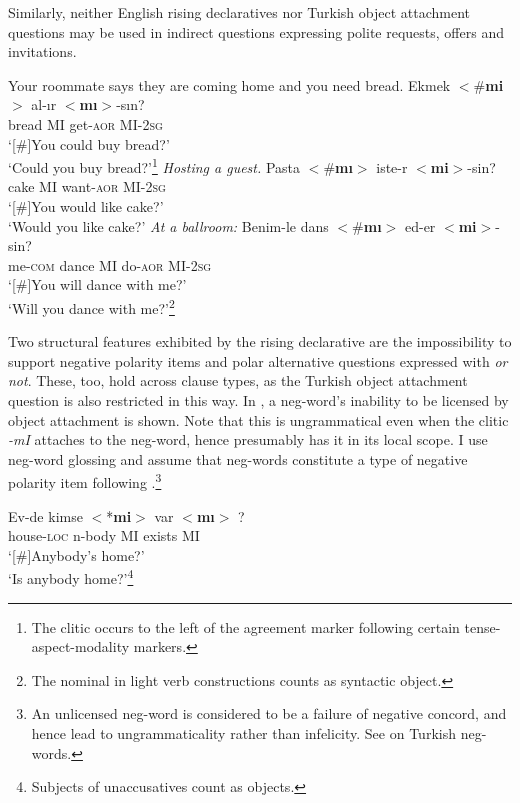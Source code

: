 \documentclass[output=paper,colorlinks,citecolor=brown]{langscibook}
\begin{document}
Similarly, neither English rising declaratives nor Turkish object attachment questions may be used in indirect questions expressing polite requests, offers and invitations.

\ea Your roommate says they are coming home and you need bread.
\sn 
\gll Ekmek $<$\#\textbf{mi}$>$ al-ır $<$\textbf{mı}$>$-sın?\\
bread \phantom{$<$}MI get-\textsc{aor} \phantom{$<$}MI-\textsc{2sg}\\
\glt `[\#]You could buy bread?'\\
`Could you buy bread?'\footnote{The clitic occurs to the left of the agreement marker following certain tense-aspect-modality markers.}  
\ex\textit{Hosting a guest.}
\sn
\gll Pasta $<$\#\textbf{mı}$>$ iste-r $<$\textbf{mi}$>$-sin?\\
cake  \phantom{$<$}MI want-\textsc{aor} \phantom{$<$}MI-\textsc{2sg}\\
\glt `[\#]You would like cake?'\\
`Would you like cake?'
\ex\textit{At a ballroom:}
\sn
\gll Benim-le dans $<$\#\textbf{mı}$>$ ed-er $<$\textbf{mi}$>$-sin?\\
me-\textsc{com} dance \phantom{$<$\#}MI do-\textsc{aor} \phantom{$<$}MI-\textsc{2sg}\\
\glt `[\#]You will dance with me?'\\
`Will you dance with me?'\footnote{The nominal in light verb constructions counts as syntactic object.}
\z

Two structural features exhibited by the rising declarative are the impossibility to support negative polarity items and polar alternative questions expressed with \textit{or not}. These, too, hold across clause types, as the Turkish object attachment question is also restricted in this way. In , a neg-word's inability to be licensed by object attachment is shown. Note that this is ungrammatical even when the clitic \textit{-mI} attaches to the neg-word, hence presumably has it in its local scope. I use neg-word glossing and assume that neg-words constitute a type of negative polarity item following \citet{Giannakidou:2000}.\footnote{An unlicensed neg-word is considered to be a failure of negative concord, and hence lead to ungrammaticality rather than infelicity. See \citet{kamali-zeijlstra-nc} on Turkish neg-words.}
 
\ea\label{ex:11:22}
\gll Ev-de kimse $<$*\textbf{mi}$>$ var $<$\textbf{mı}$>$ ?\\
house-\textsc{loc} n-body \phantom{sis}MI exists \phantom{ss}MI\\
\glt `[\#]Anybody’s home?’\\
`Is anybody home?’\footnote{Subjects of unaccusatives count as objects.}
\z
\end{document}
